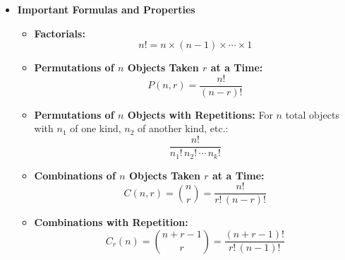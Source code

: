 \begin{itemize}
\begin{itemize}
        The correct way to think about this is to consider a general permutation done without repetitions \ref{permutation no repetition}, and divide by the number of total possible combinations ($r!$). Refer to the site for an example.


        \item \textbf{Combinations with Repetition:}
        When elements can be repeated, the number of combinations of \( r \) objects chosen from \( n \) options (with repetition allowed) is:
        \begin{equation}
            C_r(n) = \binom{n + r - 1}{r} = \frac{(n + r - 1)!}{r! \, (n - 1)!}
        \end{equation}
        where \( C_r(n) \) is the number of combinations with repetition.
    \end{itemize}

    \item \textbf{Important Formulas and Properties}
    \begin{itemize}
        \item \textbf{Factorials:}
        \begin{equation}
            n! = n \times (n - 1) \times \cdots \times 1
        \end{equation}
        
        \item \textbf{Permutations of \( n \) Objects Taken \( r \) at a Time:}
        \begin{equation}
            P(n, r) = \frac{n!}{(n - r)!}
        \end{equation}
        
        \item \textbf{Permutations of \( n \) Objects with Repetitions:}
        For \( n \) total objects with \( n_1 \) of one kind, \( n_2 \) of another kind, etc.:
        \begin{equation}
            \frac{n!}{n_1! \, n_2! \, \cdots \, n_k!}
        \end{equation}
        
        \item \textbf{Combinations of \( n \) Objects Taken \( r \) at a Time:}
        \begin{equation}
            C(n, r) = \binom{n}{r} = \frac{n!}{r! \, (n - r)!}
        \end{equation}
        
        \item \textbf{Combinations with Repetition:}
        \begin{equation}
            C_r(n) = \binom{n + r - 1}{r} = \frac{(n + r - 1)!}{r! \, (n - 1)!}
        \end{equation}
        

\end{itemize}
\end{itemize}
